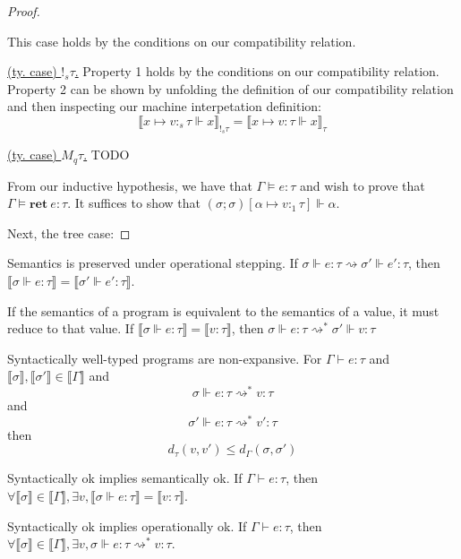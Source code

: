 \begin{proof}
\begin{description}
\begin{description}
\begin{description}
            This case holds by the conditions on our compatibility relation.
          \item{\underline{(ty. case) $!_s \tau$.}} 
            Property 1 holds by the conditions on our compatibility relation.
            Property 2 can be shown by unfolding the definition of our
            compatibility relation and then inspecting our machine interpetation
            definition:
            $$ 
            \llbracket x \mapsto v :_s \tau \Vdash x \rrbracket_{!_s \tau} = 
            \llbracket x \mapsto v : \tau \Vdash x \rrbracket_{\tau}
            $$
          \item{\underline{(ty. case) $M_q \tau$.}}
            TODO
        \end{description}
      \item[\textit{(env. size) n + 1.}] 
    \end{description}
  \item[\textsc{(ty. rule) Ret.}] 
    From our inductive hypothesis, we have that $\Gamma \vDash e : \tau$ and
    wish to prove that $\Gamma \vDash \mathbf{ret} \ e : \tau$. It suffices to
    show that $(\sigma; \sigma)[\alpha \mapsto v:_1 \tau] \Vdash \alpha$.
  \item[\textsc{(ty. rule) Rnd.}]
\end{description}

  Next, the tree case:
\end{proof}


Semantics is preserved under operational stepping. If $\sigma \Vdash e : \tau \rightsquigarrow \sigma'
\Vdash e' : \tau$, then $\llbracket \sigma \Vdash e : \tau \rrbracket =
\llbracket \sigma' \Vdash e' : \tau \rrbracket$.

If the semantics of a program is equivalent to the semantics of a value, it must
reduce to that value. If $\llbracket \sigma \Vdash e : \tau \rrbracket =
\llbracket v : \tau \rrbracket$, then $\sigma \Vdash e : \tau
\rightsquigarrow^{*} \sigma' \Vdash v : \tau$

Syntactically well-typed programs are non-expansive. For $\Gamma \vdash e : \tau
$ and $\llbracket \sigma \rrbracket, \llbracket \sigma' \rrbracket \in
\llbracket \Gamma \rrbracket $ and
$$\sigma \Vdash e : \tau \rightsquigarrow^* v : \tau$$ 
and 
$$\sigma' \Vdash e : \tau \rightsquigarrow^* v' : \tau$$
then
$$
d_{\tau}(v, v') \leq d_{\Gamma}(\sigma, \sigma')
$$

Syntactically ok implies semantically ok. If $\Gamma \vdash e : \tau$, then
$\forall \llbracket \sigma \rrbracket \in \llbracket \Gamma \rrbracket, \exists
v, \llbracket \sigma \Vdash e : \tau \rrbracket = \llbracket v : \tau
\rrbracket$.

Syntactically ok implies operationally ok. If $\Gamma \vdash e : \tau$, then
$\forall \llbracket \sigma \rrbracket \in \llbracket \Gamma \rrbracket, \exists
v, \sigma \Vdash e : \tau \rightsquigarrow^{*} v : \tau$.

